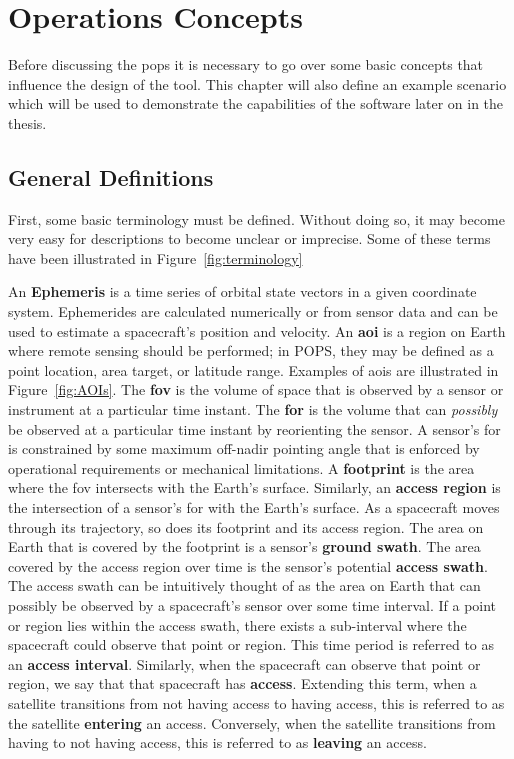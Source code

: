 \glsresetall{} 
\chapter{Operations Concepts}\label{chap:ops}


Before discussing the \gls{pops} it is necessary to go over some basic concepts
that influence the design of the tool. This chapter will also define an example
scenario which will be used to demonstrate the capabilities of the software
later on in the thesis.

\section{General Definitions}

First, some basic terminology must be defined.  Without doing so, it may become
very easy for descriptions to become unclear or imprecise. Some of these terms
have been illustrated in Figure~\ref{fig:terminology}

An \textbf{Ephemeris} is a time series of orbital state vectors in a given
coordinate system. Ephemerides are calculated numerically or from sensor data
and can be used to estimate a spacecraft’s position and velocity.  An
\textbf{\gls{aoi}} is a region on Earth where remote sensing should be
performed; in POPS, they may be defined as a point location, area target, or
latitude range.  Examples of \glspl{aoi} are illustrated in
Figure~\ref{fig:AOIs}. The \textbf{\gls{fov}} is the volume of space that is
observed by a sensor or instrument at a particular time instant.  The
\textbf{\gls{for}} is the volume that can \textit{possibly} be observed at a
particular time instant by reorienting the sensor. A sensor’s \gls{for} is
constrained by some maximum off-nadir pointing angle that is enforced by
operational requirements or mechanical limitations. A \textbf{footprint} is the
area where the \gls{fov} intersects with the Earth’s surface.  Similarly, an
\textbf{access region} is the intersection of a sensor’s \gls{for} with the
Earth’s surface.  As a spacecraft moves through its trajectory, so does its
footprint and its access region.  The area on Earth that is covered by the
footprint is a sensor’s \textbf{ground swath}. The area covered by the access
region over time is the sensor’s potential \textbf{access swath}.  The access
swath can be intuitively thought of as the area on Earth that can possibly be
observed by a spacecraft’s sensor over some time interval.  If a point or
region lies within the access swath, there exists a sub-interval where the
spacecraft could observe that point or region. This time period is referred to
as an \textbf{access interval}. Similarly, when the spacecraft can observe that
point or region, we say that that spacecraft has \textbf{access}.  Extending
this term, when a satellite transitions from not having access to having
access, this is referred to as the satellite \textbf{entering} an access.
Conversely, when the satellite transitions from having to not having access,
this is referred to as \textbf{leaving} an access. 


